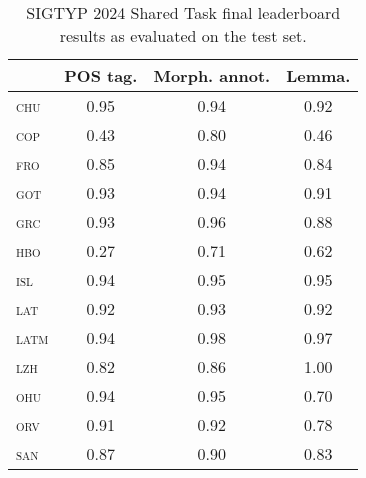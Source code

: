 \documentclass{../acl_latex.tex}
\begin{document}
\begin{table}[t]
\centering
\begin{tabular}{lccc}
\toprule
                 & POS tag. & Morph. annot. & Lemma. \\ \midrule
\textsc{chu}     & 0.95     & 0.94          & 0.92   \\ 
\textsc{cop}     & 0.43     & 0.80         & 0.46   \\ 
\textsc{fro}     & 0.85     & 0.94          & 0.84   \\
\textsc{got}     & 0.93     & 0.94          & 0.91   \\
\textsc{grc}     & 0.93     & 0.96          & 0.88   \\
\textsc{hbo}     & 0.27     & 0.71         & 0.62   \\
\textsc{isl}     & 0.94     & 0.95          & 0.95   \\
\textsc{lat}     & 0.92     & 0.93          & 0.92   \\
\textsc{latm}    & 0.94     & 0.98          & 0.97   \\
\textsc{lzh}     & 0.82     & 0.86          & 1.00   \\
\textsc{ohu}     & 0.94     & 0.95          & 0.70   \\
\textsc{orv}     & 0.91     & 0.92          & 0.78   \\
\textsc{san}     & 0.87     & 0.90          & 0.83   \\ \bottomrule 
\end{tabular}
\caption{
    SIGTYP 2024 Shared Task final leaderboard results as evaluated on the test set.
}
\label{table:main_results}
\end{table}
\end{document}
